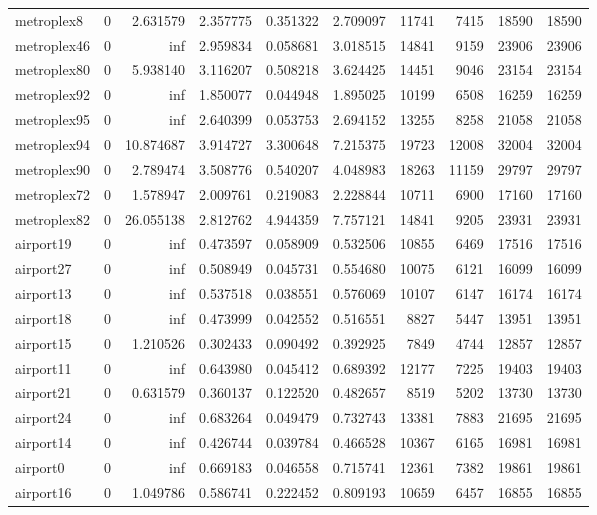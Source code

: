 \begin{longtable}{|l|r|r|r|r|r|r|r|r|r|}
metroplex8 & 0 & 2.631579 & 2.357775 & 0.351322 & 2.709097 & 11741 & 7415 & 18590 & 18590 \\
metroplex46 & 0 & inf & 2.959834 & 0.058681 & 3.018515 & 14841 & 9159 & 23906 & 23906 \\
metroplex80 & 0 & 5.938140 & 3.116207 & 0.508218 & 3.624425 & 14451 & 9046 & 23154 & 23154 \\
metroplex92 & 0 & inf & 1.850077 & 0.044948 & 1.895025 & 10199 & 6508 & 16259 & 16259 \\
metroplex95 & 0 & inf & 2.640399 & 0.053753 & 2.694152 & 13255 & 8258 & 21058 & 21058 \\
metroplex94 & 0 & 10.874687 & 3.914727 & 3.300648 & 7.215375 & 19723 & 12008 & 32004 & 32004 \\
metroplex90 & 0 & 2.789474 & 3.508776 & 0.540207 & 4.048983 & 18263 & 11159 & 29797 & 29797 \\
metroplex72 & 0 & 1.578947 & 2.009761 & 0.219083 & 2.228844 & 10711 & 6900 & 17160 & 17160 \\
metroplex82 & 0 & 26.055138 & 2.812762 & 4.944359 & 7.757121 & 14841 & 9205 & 23931 & 23931 \\
airport19 & 0 & inf & 0.473597 & 0.058909 & 0.532506 & 10855 & 6469 & 17516 & 17516 \\
airport27 & 0 & inf & 0.508949 & 0.045731 & 0.554680 & 10075 & 6121 & 16099 & 16099 \\
airport13 & 0 & inf & 0.537518 & 0.038551 & 0.576069 & 10107 & 6147 & 16174 & 16174 \\
airport18 & 0 & inf & 0.473999 & 0.042552 & 0.516551 & 8827 & 5447 & 13951 & 13951 \\
airport15 & 0 & 1.210526 & 0.302433 & 0.090492 & 0.392925 & 7849 & 4744 & 12857 & 12857 \\
airport11 & 0 & inf & 0.643980 & 0.045412 & 0.689392 & 12177 & 7225 & 19403 & 19403 \\
airport21 & 0 & 0.631579 & 0.360137 & 0.122520 & 0.482657 & 8519 & 5202 & 13730 & 13730 \\
airport24 & 0 & inf & 0.683264 & 0.049479 & 0.732743 & 13381 & 7883 & 21695 & 21695 \\
airport14 & 0 & inf & 0.426744 & 0.039784 & 0.466528 & 10367 & 6165 & 16981 & 16981 \\
airport0 & 0 & inf & 0.669183 & 0.046558 & 0.715741 & 12361 & 7382 & 19861 & 19861 \\
airport16 & 0 & 1.049786 & 0.586741 & 0.222452 & 0.809193 & 10659 & 6457 & 16855 & 16855 \\

\end{longtable}
